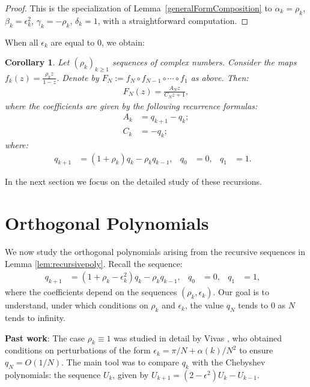\documentclass{amsart}
\newtheorem{cor}{Corollary}
\theoremstyle{remark}
\theoremstyle{definition}
\begin{document}
\begin{proof}
This is the specialization of Lemma~\ref{generalFormComposition} to $\alpha_k=\rho_k$, $\beta_k=\epsilon_k^2$, $\gamma_k=-\rho_k$, $\delta_k=1$, with a straightforward computation.
\end{proof}

When all $\epsilon_k$ are equal to $0$, we obtain:

\begin{cor}\label{cor:onlyrho}
Let $(\rho_k)_{k \geq 1}$ sequences of complex numbers. Consider the 
maps $\displaystyle{f_{k}(z) = \frac{\rho_{k}z}{1-z}}$. 
Denote  by $F_N:=f_N \circ f_{N-1} \circ \cdots \circ f_1$ as above. Then: 
 \begin{align*}
F_N(z) = \frac{A_N z}{C_N z +1},
\end{align*}
where the coefficients are given by the following recurrence formulas:
\begin{align*}
A_{k} &= q_{k+1}-q_{k};\\
C_{k} &= -q_{k};
\end{align*}
where:
\begin{align*}
q_{k+1} &= (1+\rho_k) q_k-\rho_k q_{k-1}, & q_0&=0, & q_1&=1. &
\end{align*}
\end{cor}

In the next section we focus on the detailed study of these recursions. 



\section{Orthogonal Polynomials}\label{sec:orthogonalpolynomials}

We now study the orthogonal polynomials arising from the recursive sequences in Lemma \ref{lem:recursivepoly}.
Recall the sequence:
\begin{align*}
q_{k+1} &= (1+\rho_k-\epsilon_k^2) q_{k}-\rho_k q_{k-1}, & q_0&=0,& q_1&=1, &
\end{align*}
where the coefficients depend on the sequences $(\rho_k,\epsilon_k)$.
Our goal is to understand, under which conditions on $\rho_k$ and $\epsilon_k$, the value $q_N$ tends to $0$ as $N$ tends to infinity.
	
	\textbf{Past work}: The case $\rho_k \equiv 1$
 was studied in detail by Vivas \cite{Viv20}, who obtained conditions on perturbations of the form  $\epsilon_k = \pi/N + \alpha(k)/N^2$ to ensure $q_N = O(1/N)$. The main tool was to compare $q_k$ with the Chebyshev polynomials: the sequence $U_k$, given by $U_{k+1}=(2-\epsilon^2)U_k-U_{k-1}$.
	
\end{document}
